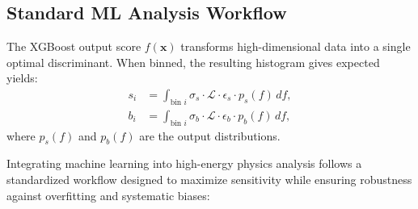 \subsection{Standard ML Analysis Workflow}
\label{ssec:ml_workflow}

The XGBoost output score $f(\mathbf{x})$ transforms high-dimensional data into a single optimal discriminant. When binned, the resulting histogram gives expected yields:
\begin{align}
s_i &= \int_{\text{bin } i} \sigma_s \cdot \mathcal{L} \cdot \epsilon_s \cdot p_s(f) \, df, \\
b_i &= \int_{\text{bin } i} \sigma_b \cdot \mathcal{L} \cdot \epsilon_b \cdot p_b(f) \, df,
\end{align}
where $p_s(f)$ and $p_b(f)$ are the output distributions. 

Integrating machine learning into high-energy physics analysis follows a standardized workflow designed to maximize sensitivity while ensuring robustness against overfitting and systematic biases:


